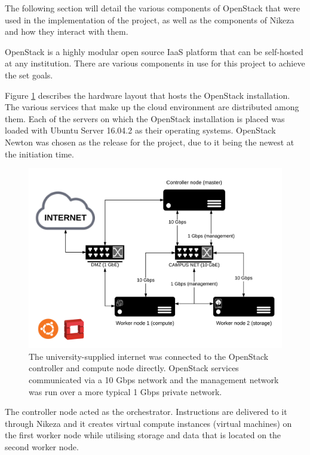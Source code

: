 The following section will detail the various components of OpenStack that were used in the implementation of the project, as well as the components of Nikeza and how they interact with them.

OpenStack is a highly modular open source IaaS platform that can be self-hosted at any institution. There are various components in use for this project to achieve the set goals.

Figure \ref{fig:network_layout} describes the hardware layout that hosts the OpenStack installation. The various services that make up the cloud environment are distributed among them. Each of the servers on which the OpenStack installation is placed was loaded with Ubuntu Server 16.04.2 as their operating systems. OpenStack Newton was chosen as the release for the project, due to it being the newest at the initiation time.

\begin{figure}[ht!]
\centering
\includegraphics[width=\textwidth]{Figures/3_hardware_layout_network.png}
\decoRule
\caption[OpenStack Hardware and Network Layout]{The university-supplied internet was connected to the OpenStack controller and compute node directly. OpenStack services communicated via a 10 Gbps network and the management network was run over a more typical 1 Gbps private network.}
\label{fig:network_layout}
\end{figure}

The controller node acted as the orchestrator. Instructions are delivered to it through Nikeza and it creates virtual compute instances (virtual machines) on the first worker node while utilising storage and data that is located on the second worker node.

